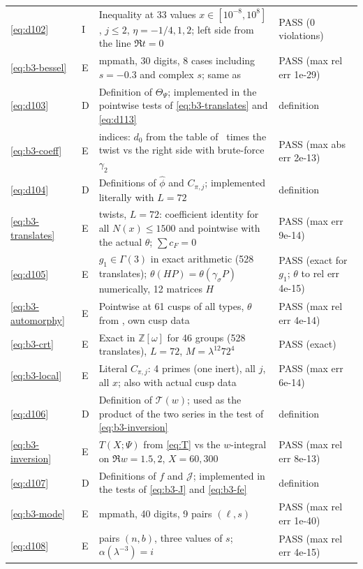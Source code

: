 \documentclass[11pt]{article}
\numberwithin{equation}{section}
\begin{document}
\begin{longtable}{@{}>{\raggedright\arraybackslash}p{1.2cm}>{\centering\arraybackslash}p{0.7cm}>{\raggedright\arraybackslash}p{9.05cm}>{\raggedright\arraybackslash}p{4.3cm}@{}}
\eqref{eq:d102} & I & Inequality at 33 values $x\in[10^{-8},10^8]$, $j\le2$, $\eta=-1/4,1,2$; left side from the line $\Re t=0$ & PASS (0 violations)\\
\eqref{eq:b3-bessel} & E & mpmath, 30 digits, 8 cases including $s=-0.3$ and complex $s$; same as \cite[(5.21)]{QF} & PASS (max rel err 1e-29)\\
\eqref{eq:d103} & D & Definition of $\Theta_\Psi$; implemented in the pointwise tests of \eqref{eq:b3-translates} and \eqref{eq:d113} & definition\\
\eqref{eq:b3-coeff} & E & 3424 indices: $d_0$ from the table of~\cite{QF} times the twist vs the right side with brute-force $\gamma_2$ & PASS (max abs err 2e-13)\\
\eqref{eq:d104} & D & Definitions of $\hat\phi$ and $C_{\pi,j}$; implemented literally with $L=72$ & definition\\
\eqref{eq:b3-translates} & E & 8 twists, $L=72$: coefficient identity for all $N(x)\le1500$ and pointwise with the actual $\theta$; $\sum c_F=0$ & PASS (max err 9e-14)\\
\eqref{eq:d105} & E & $g_1\in\Gamma(3)$ in exact arithmetic (528 translates); $\theta(HP)=\theta(\gamma_\sigma P)$ numerically, 12 matrices $H$ & PASS (exact for $g_1$; $\theta$ to rel err 4e-15)\\
\eqref{eq:b3-automorphy} & E & Pointwise at 61 cusps of all types, $\theta$ from \cite[Theorem~23]{QF}, own cusp data & PASS (max rel err 4e-14)\\
\eqref{eq:b3-crt} & E & Exact in $\mathbb Z[\omega]$ for 46 groups (528 translates), $L=72$, $M=\lambda^{12}72^4$ & PASS (exact)\\
\eqref{eq:b3-local} & E & Literal $C_{\pi,j}$: 4 primes (one inert), all $j$, all $x$; also with actual cusp data & PASS (max err 6e-14)\\
\eqref{eq:d106} & D & Definition of $\mathcal T(w)$; used as the product of the two series in the test of \eqref{eq:b3-inversion} & definition\\
\eqref{eq:b3-inversion} & E & $T(X;\Psi)$ from \eqref{eq:T} vs the $w$-integral on $\Re w=1.5,2$, $X=60,300$ & PASS (max rel err 8e-13)\\
\eqref{eq:d107} & D & Definitions of $f$ and $\mathcal J$; implemented in the tests of \eqref{eq:b3-J} and \eqref{eq:b3-fe} & definition\\
\eqref{eq:b3-mode} & E & mpmath, 40 digits, 9 pairs $(\ell,s)$ & PASS (max rel err 1e-40)\\
\eqref{eq:d108} & E & 720 pairs $(n,b)$, three values of $s$; $\alpha(\lambda^{-3})=i$ & PASS (max rel err 4e-15)\\

\end{longtable}
\end{document}
